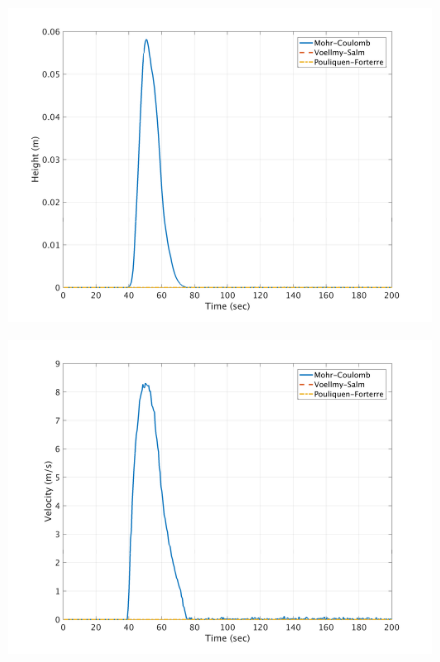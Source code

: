 \documentclass[a4paper,10pt]{article}
\begin{document}
\begin{figure}[H]
	\begin{minipage}[b]{0.5\linewidth}
	\centering
    \includegraphics[width=1\textwidth]{HeightMeans/H10All.png}     
        \label{fig:MFHR_L10}
	\end{minipage}
	\begin{minipage}[b]{0.5\linewidth}
	\centering
    \includegraphics[width=1\textwidth]{VelocityMeans/V10All.png}
        \label{fig:MFVR_L10}
	\end{minipage}
	

\end{figure}
\end{document}
